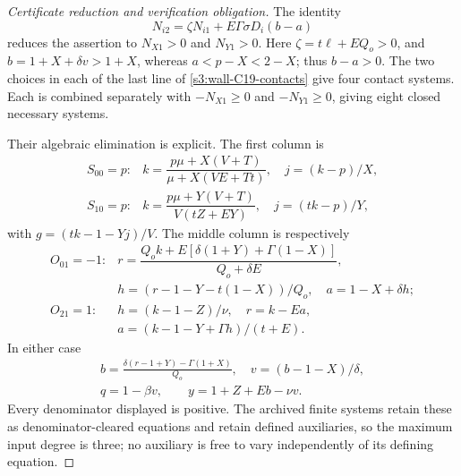 \documentclass[11pt,reqno]{amsart}
\theoremstyle{definition}
\theoremstyle{remark}
\begin{document}
\begin{proof}[Certificate reduction and verification obligation]
The identity
\[
 N_{i2}=\zeta N_{i1}+E\Gamma\sigma D_i(b-a)
\]
reduces the assertion to \(N_{X1}>0\) and \(N_{Y1}>0\).
Here \(\zeta=t\ell+EQ_o>0\), and
\(b=1+X+\delta v>1+X\), whereas
\(a<p-X<2-X\); thus \(b-a>0\).
The two choices in each of the last line of
\eqref{s3:wall-C19-contacts} give four contact systems. Each is
combined separately with \(-N_{X1}\ge0\) and \(-N_{Y1}\ge0\),
giving eight closed necessary systems.

Their algebraic elimination is explicit. The first column is
\[
\begin{array}{ll}
 S_{00}=p:& k=\dfrac{p\mu+X(V+T)}{\mu+X(VE+Tt)},\quad j=(k-p)/X,\\[1mm]
 S_{10}=p:& k=\dfrac{p\mu+Y(V+T)}{V(tZ+EY)},\quad j=(tk-p)/Y,
\end{array}
\]
with \(g=(tk-1-Yj)/V\). The middle column is respectively
\[
\begin{array}{ll}
 O_{01}=-1:&
 r=\dfrac{Q_ok+E[\delta(1+Y)+\Gamma(1-X)]}{Q_o+\delta E},\\
 &h=(r-1-Y-t(1-X))/Q_o,\quad a=1-X+\delta h;\\[1mm]
  O_{21}=1:&h=(k-1-Z)/\nu,\quad r=k-Ea,\\
  &a=(k-1-Y+\Gamma h)/(t+E).
\end{array}
\]
In either case
\[
 \begin{gathered} b=\frac{\delta(r-1+Y)-\Gamma(1+X)}{Q_o},\quad v=(b-1-X)/\delta,\\
 q=1-\beta v,\qquad y=1+Z+Eb-\nu v.\end{gathered}
\]
Every denominator displayed is positive. The archived finite systems
retain these as denominator-cleared equations and retain defined
auxiliaries, so the maximum input degree is three; no auxiliary is
free to vary independently of its defining equation.


\end{proof}
\end{document}
